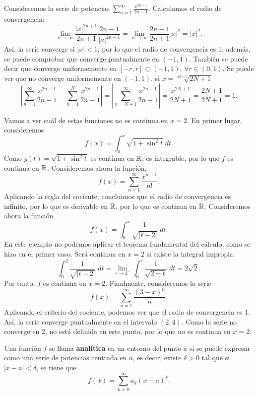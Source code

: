 \begin{eg}
\normalfont Consideremos la serie de potencias $\displaystyle \sum^{\infty}_{n = 1}\frac{x^{2n-1}}{2n-1} $. Calculamos el radio de convergencia:
\[\lim_{n \to \infty}\frac{ \left|x\right|^{2n+1}}{2n+1} \frac{2n-1}{ \left|x\right|^{2n-1}} = \lim_{n \to \infty} \frac{2n-1}{2n+1} \left|x\right|^{2} = \left|x\right|^{2} .\]
Así, la serie converge si $\displaystyle \left|x\right| < 1 $, por lo que el radio de convergencia es 1, además, se puede comprobar que converge puntualmente en $\displaystyle \left(-1, 1\right) $. También se puede decir que converge uniformemente en $\displaystyle \left[-r,r\right] \subset \left(-1,1\right) $, $\displaystyle \forall r \in \left(0,1\right) $. Se puede ver que no converge uniformemente en $\displaystyle \left(-1,1\right) $, si $\displaystyle x = \sqrt[2N+1]{2N+1} $ 
\[ \left|\sum^{\infty}_{n = 1}\frac{x^{2n-1}}{2n-1}-\sum^{N}_{n = 1}\frac{x^{2n-1}}{2n-1}\right| = \left|\sum^{\infty}_{n = N+1}\frac{x^{2n-1}}{2n-1}\right| = \frac{x^{2N+1}}{2N+1} = \frac{2N+1}{2N+1} = 1 .\]
\end{eg}
\begin{eg}
\normalfont Vamos a ver cuál de estas funciones no es continua en $\displaystyle x = 2 $. En primer lugar, consideremos 
\[f\left(x\right) = \int^{x}_{0} \sqrt{1+\sin ^{2}t} \; dt.\]
Como $\displaystyle g\left(t\right) = \sqrt{1 + \sin ^{2}t} $ es continua en $\displaystyle \mathbb{R} $, es integrable, por lo que $\displaystyle f $ es continua en $\displaystyle \mathbb{R} $. Consideremos ahora la función,
\[ f\left(x\right) = \sum^{\infty}_{n = 1} \frac{x^{n-1}}{n!} .\]
Aplicando la regla del cociente, concluimos que el radio de convergencia es infinito, por lo que es derivable en $\displaystyle \mathbb{R} $, por lo que es continua en $\displaystyle \mathbb{R} $. Consideremos ahora la función 
\[f\left(x\right) = \int^{x}_{0} \frac{1}{\sqrt{ \left|t-2\right|}} \; dt .\]
En este ejemplo no podemos aplicar el teorema fundamental del cálculo, como se hizo en el primer caso. Será continua en $\displaystyle x = 2 $ si existe la integral impropia:
\[\int^{2}_{0} \frac{1}{\sqrt{ \left|t-2\right|}} \; dt = \lim_{r \to 2^{-}} \int^{r}_{0} \frac{1}{\sqrt{2-t}} \; dt = 2\sqrt{2} .\]
Por tanto, $\displaystyle f $ es continua en $\displaystyle x = 2 $. Finalmente, consideremos la serie
\[f\left(x\right) = \sum^{\infty}_{n = 1}\frac{\left(3-x\right)^{n}}{n} .\]
Aplicando el criterio del cociente, podemos ver que el radio de convergencia es 1. Así, la serie converge puntualmente en el intervalo $\displaystyle \left(2,4\right) $. Como la serie no converge en $\displaystyle 2 $, no está definida en este punto, por lo que no es continua en $\displaystyle x = 2 $.  
\end{eg}

\begin{fdefinition}
\normalfont Una función $\displaystyle f $ se llama \textbf{analítica} en un entorno del punto $\displaystyle a $ si se puede expresar como una serie de potencias centrada en $\displaystyle a $, es decir, existe $\displaystyle \delta > 0 $ tal que si $\displaystyle \left|x-a\right|<\delta  $, se tiene que 
\[f\left(x\right) = \sum^{\infty}_{ k= 0}a_{k}\left(x-a\right)^{k} .\]
\end{fdefinition}

